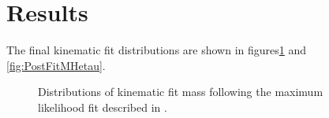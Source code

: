 \section{Results}

The final kinematic fit distributions are shown in
figures\ref{fig:PostFitMHmutau} and \ref{fig:PostFitMHetau}.

\begin{figure}
\begin{center}

\end{center}
\caption{
Distributions of kinematic fit mass following the maximum likelihood fit
described in .}
\label{fig:PostFitMHmutau}
\end{figure} 


